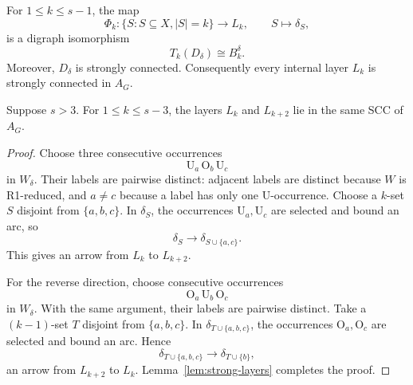\documentclass[10pt,a4paper]{amsart}
\begin{document}
\begin{lemma}\label{lem:strong-layers}
For \(1\le k\le s-1\), the map
\[
  \Phi_k:\{ S : S\subseteq X, |S|=k \} \longrightarrow L_k,
  \qquad S\longmapsto\delta_S,
\]
is a digraph isomorphism
\begin{equation}\label{eq:token-layer-isomorphism}
  T_k(D_\delta)\cong B_k^\delta.
\end{equation}
Moreover, \(D_\delta\) is strongly connected.  Consequently every internal
layer \(L_k\) is strongly connected in \(A_G\).
\end{lemma}

\begin{lemma}\label{lem:layer-bridges}
Suppose \(s>3\).  For \(1\le k\le s-3\), the layers \(L_k\) and
\(L_{k+2}\) lie in the same SCC of \(A_G\).
\end{lemma}

\begin{proof}
Choose three consecutive occurrences
\[
  \mathrm U_a\,\mathrm O_b\,\mathrm U_c
\]
in \(W_\delta\).  Their labels are pairwise distinct: adjacent labels are
distinct because \(W\) is R1-reduced, and \(a\ne c\) because a label has
only one \(\mathrm U\)-occurrence.  Choose a \(k\)-set \(S\) disjoint
from \(\{a,b,c\}\).  In \(\delta_S\), the occurrences
\(\mathrm U_a,\mathrm U_c\) are selected and bound an arc, so
\[
  \delta_S\longrightarrow\delta_{S\cup\{a,c\}}.
\]
This gives an arrow from \(L_k\) to \(L_{k+2}\).

For the reverse direction, choose consecutive occurrences
\[
  \mathrm O_a\,\mathrm U_b\,\mathrm O_c
\] in  \(W_\delta\). With the same argument, their labels are pairwise distinct.
Take a \((k-1)\)-set \(T\) disjoint from \(\{a,b,c\}\).  In
\(\delta_{T\cup\{a,b,c\}}\), the occurrences
\(\mathrm O_a,\mathrm O_c\) are selected and bound an arc.  Hence
\[
  \delta_{T\cup\{a,b,c\}}
  \longrightarrow
  \delta_{T\cup\{b\}},
\]
an arrow from \(L_{k+2}\) to \(L_k\).  Lemma~\ref{lem:strong-layers}
completes the proof.
\end{proof}
\end{document}
